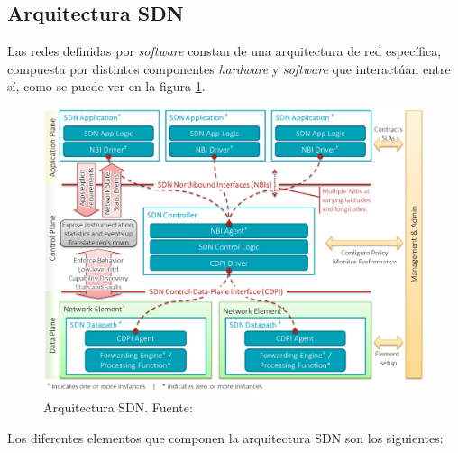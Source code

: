 \subsection{Arquitectura SDN}

Las redes definidas por \textit{software} constan de una arquitectura de red específica, compuesta por distintos componentes \textit{hardware} y \textit{software} que interactúan entre sí, como se puede ver en la figura \ref{fig:arquitecturasdn}.
 
\begin{figure}[!ht]
	\centering
	\includegraphics[width=0.75\linewidth]{imagenes/arquitectura_sdn}
	\caption{Arquitectura SDN. Fuente:\cite{sdnbib}}
	\label{fig:arquitecturasdn}
\end{figure}

Los diferentes elementos que componen la arquitectura \ac{SDN} son los siguientes:

